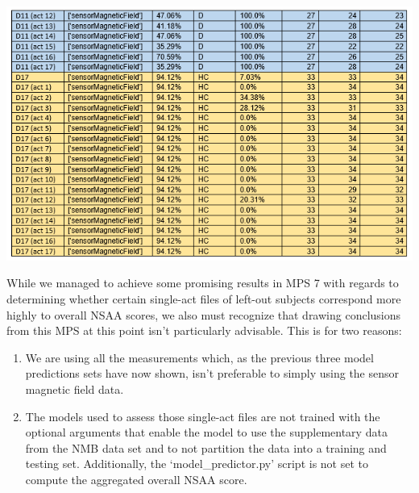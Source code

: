 \documentclass[12pt,twoside]{report}
\begin{document}
\begin{center}
\includegraphics[scale=0.8]{project_figures/fig11_33}
\end{center}

\quad While we managed to achieve some promising results in MPS 7 with regards to determining whether certain single-act files of left-out subjects correspond more highly to overall NSAA scores, we also must recognize that drawing conclusions from this MPS at this point isn’t particularly advisable. This is for two reasons:

\begin{enumerate}
	\item We are using all the measurements which, as the previous three model predictions sets have now shown, isn’t preferable to simply using the sensor magnetic field data.
	\item The models used to assess those single-act files are not trained with the optional arguments that enable the model to use the supplementary data from the NMB data set and to not partition the data into a training and testing set. Additionally, the ‘model\_predictor.py’ script is not set to compute the aggregated overall NSAA score.
\end{enumerate}
\end{document}
